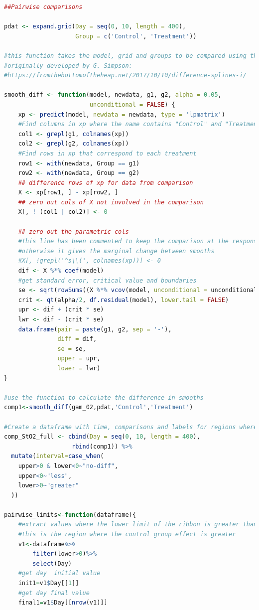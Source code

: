 \documentclass[
]{article}
\begin{document}
\begin{lstlisting}[language=R]
##Pairwise comparisons

pdat <- expand.grid(Day = seq(0, 10, length = 400),
                    Group = c('Control', 'Treatment'))

#this function takes the model, grid and groups to be compared using the lpmatrix
#originally developed by G. Simpson:
#https://fromthebottomoftheheap.net/2017/10/10/difference-splines-i/

smooth_diff <- function(model, newdata, g1, g2, alpha = 0.05,
                        unconditional = FALSE) {
    xp <- predict(model, newdata = newdata, type = 'lpmatrix')
    #Find columns in xp where the name contains "Control" and "Treatment"
    col1 <- grepl(g1, colnames(xp))
    col2 <- grepl(g2, colnames(xp))
    #Find rows in xp that correspond to each treatment
    row1 <- with(newdata, Group == g1)
    row2 <- with(newdata, Group == g2)
    ## difference rows of xp for data from comparison
    X <- xp[row1, ] - xp[row2, ]
    ## zero out cols of X not involved in the comparison
    X[, ! (col1 | col2)] <- 0
    
    ## zero out the parametric cols
    #This line has been commented to keep the comparison at the response level,
    #otherwise it gives the marginal change between smooths
    #X[, !grepl('^s\\(', colnames(xp))] <- 0
    dif <- X %*% coef(model)
    #get standard error, critical value and boundaries
    se <- sqrt(rowSums((X %*% vcov(model, unconditional = unconditional)) * X))
    crit <- qt(alpha/2, df.residual(model), lower.tail = FALSE)
    upr <- dif + (crit * se)
    lwr <- dif - (crit * se)
    data.frame(pair = paste(g1, g2, sep = '-'),
               diff = dif,
               se = se,
               upper = upr,
               lower = lwr)
}

#use the function to calculate the difference in smooths
comp1<-smooth_diff(gam_02,pdat,'Control','Treatment')

#Create a dataframe with time, comparisons and labels for regions where difference exists
comp_StO2_full <- cbind(Day = seq(0, 10, length = 400),
                   rbind(comp1)) %>%
  mutate(interval=case_when(
    upper>0 & lower<0~"no-diff",
    upper<0~"less",
    lower>0~"greater"
  ))

pairwise_limits<-function(dataframe){
    #extract values where the lower limit of the ribbon is greater than zero
    #this is the region where the control group effect is greater
    v1<-dataframe%>%
        filter(lower>0)%>%
        select(Day)
    #get day  initial value
    init1=v1$Day[[1]]
    #get day final value
    final1=v1$Day[[nrow(v1)]]


\end{lstlisting}
\end{document}
